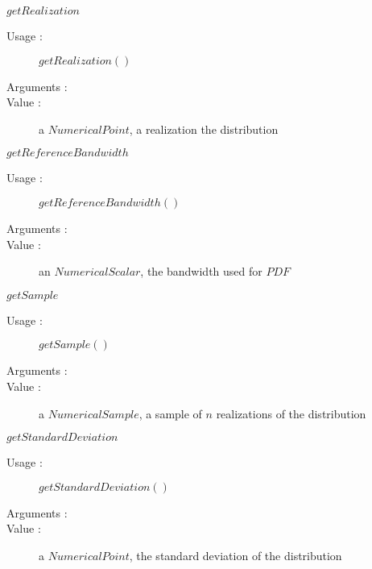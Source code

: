 \begin{description}
\begin{description}
  \item $getRealization$
    \begin{description}
    \item[Usage :]  $getRealization()$
    \item[Arguments :]  \strut
    \item[Value :] a $NumericalPoint$, a realization the distribution
    \end{description}

  \item $getReferenceBandwidth$
    \begin{description}
    \item[Usage :]  $getReferenceBandwidth()$
    \item[Arguments :]  \strut
    \item[Value :] an $NumericalScalar$, the bandwidth used for $PDF$
    \end{description}

  \item $getSample$
    \begin{description}
    \item[Usage :]  $getSample()$
    \item[Arguments :]  \strut
    \item[Value :] a $NumericalSample$, a sample of $n$ realizations of the distribution
    \end{description}

  \item $getStandardDeviation$
    \begin{description}
    \item[Usage :]  $getStandardDeviation()$
    \item[Arguments :]  \strut
    \item[Value :] a $NumericalPoint$, the standard deviation of the distribution
    \end{description}


\end{description}
\end{description}
